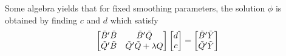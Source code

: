 \noindent
Some algebra yields that for fixed smoothing parameters, the solution $\phi$ is obtained by finding $c$ and $d$ which satisfy
\begin{equation} \label{eq:vectorized-normal-equations}
\begin{bmatrix}
\tilde{B}'\tilde{B} & \tilde{B}'\tilde{Q} \\
\tilde{Q}'\tilde{B} & \tilde{Q}'\tilde{Q} + \lambda Q\\
\end{bmatrix}
\begin{bmatrix}
d\\
c\\
\end{bmatrix}
= \begin{bmatrix}
\tilde{B}'\tilde{Y} \\
 \tilde{Q}'\tilde{Y}\\
\end{bmatrix}
\end{equation}

